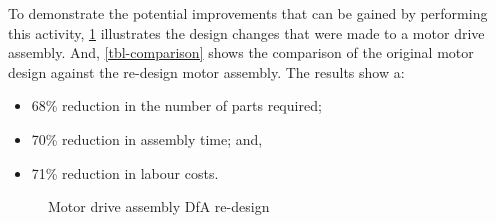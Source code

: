 To demonstrate the potential improvements that can be gained by performing this activity, \cref{fig-motor} illustrates the design changes that were made to a motor drive assembly.
And, \cref{tbl-comparison} shows the comparison of the original motor design against the re-design motor assembly.
The results show a:

\begin{itemize}
    \item 68\% reduction in the number of parts required;
    \item 70\% reduction in assembly time; and,
    \item 71\% reduction in labour costs.
\end{itemize}


\begin{figure}[ht!]

    \hfill
    \hfill 
    \hfill
    
    \vspace{1em}
    \caption{Motor drive assembly DfA re-design}\label{fig-motor}
\end{figure}

